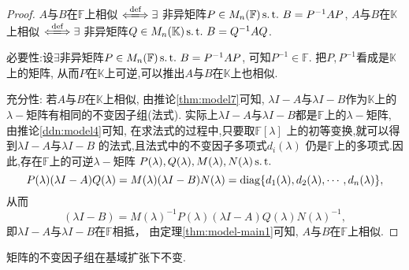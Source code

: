 \begin{proof}
  $A$与$B$在$\mathbb{F}$上相似 $\xLongleftrightarrow {\text{def}} \exists$
  非异矩阵$P\in M_n(\mathbb{F}) \operatorname{s.t.{}} B=P^{-1}AP$,
  $A$与$B$在$\mathbb{K}$上相似 $\xLongleftrightarrow {\text{def}} \exists$
  非异矩阵$Q\in M_n(\mathbb{K}) \operatorname{s.t.{}} B=Q^{-1}AQ$.

  必要性:设$\exists$非异矩阵$P\in M_n(\mathbb{F}) \operatorname{s.t.{}} B=P^{-1}AP$,
  可知$P^{-1}\in \mathbb{F}$.
  把$P,P^{-1}$看成是$\mathbb{K}$上的矩阵,
  从而$P$在$\mathbb{K}$上可逆,可以推出$A$与$B$在$\mathbb{K}$上也相似.

  充分性: 若$A$与$B$在$\mathbb{K}$上相似,
  由推论\ref{thm:model7}可知, 
  $\lambda I-A$与$\lambda I-B$作为$\mathbb{K}$上的
  $\lambda-$矩阵有相同的不变因子组(法式).
  实际上$\lambda I-A$与$\lambda I-B$都是$\mathbb{F}$上的$\lambda-$矩阵,
  由推论\ref{ddn:model4}可知,
  在求法式的过程中,只要取$\mathbb{F}[\lambda]$
  上的初等变换,就可以得到$\lambda I-A$与$\lambda I-B$
  的法式,且法式中的不变因子多项式$d_i(\lambda)$
  仍是$\mathbb{F}$上的多项式.因此,存在$\mathbb{F}$上的可逆$\lambda-$矩阵
  $P(\lambda),Q(\lambda),M(\lambda),N(\lambda) \operatorname{s.t.{}}$
  \[P(\lambda)(\lambda I-A)Q(\lambda)=
    M(\lambda)(\lambda I-B)N(\lambda)=
    \operatorname{diag}\{d_1(\lambda),d_2(\lambda),\cdots,d_n(\lambda)\},\]
  从而
  \[(\lambda I-B)=M(\lambda)^{-1}P(\lambda)(\lambda I-A)Q(\lambda)N(\lambda)^{-1},\]
  即$\lambda I-A$与$\lambda I-B$在$\mathbb{F}$相抵，
  由定理\ref{thm:model-main1}可知,
  $A$与$B$在$\mathbb{F}$上相似.
\end{proof}
\begin{deduction}
  矩阵的不变因子组在基域扩张下不变.
\end{deduction}


